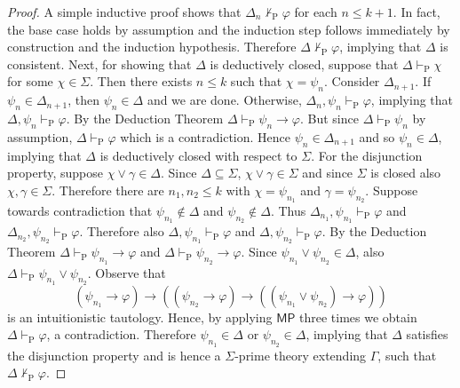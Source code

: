 \documentclass{myifcolog}
\numberwithin{theorem}{section}
\begin{document}
\begin{proof}
A simple inductive proof shows that $\Delta_n \not \vdash_\mathrm{P} \varphi$ for each $n \leq k+1$. In fact, the base case holds by assumption and the induction step follows immediately by construction and the induction hypothesis. Therefore $\Delta \not \vdash_\mathrm{P} \varphi$, implying that $\Delta$ is consistent. Next, for showing that $\Delta$ is deductively closed, suppose that $\Delta \vdash_\mathrm{P} \chi$ for some $\chi \in \Sigma$. Then there exists $n \leq k$ such that $\chi = \psi_n$. Consider $\Delta_{n+1}$. If $\psi_n \in \Delta_{n+1}$, then $\psi_n \in \Delta$ and we are done. Otherwise, $\Delta_n, \psi_n \vdash_\mathrm{P} \varphi$, implying that $\Delta, \psi_n \vdash_\mathrm{P} \varphi$. By the Deduction Theorem $\Delta \vdash_\mathrm{P} \psi_n \rightarrow \varphi$. But since $\Delta \vdash_\mathrm{P} \psi_n$ by assumption, $\Delta \vdash_\mathrm{P} \varphi$ which is a contradiction. Hence $\psi_n \in \Delta_{n+1}$ and so $\psi_n \in \Delta$, implying that $\Delta$ is deductively closed with respect to $\Sigma$. For the disjunction property, suppose $\chi \vee \gamma \in \Delta$. Since $\Delta \subseteq \Sigma$, $\chi \vee \gamma \in \Sigma$ and since $\Sigma$ is closed also $\chi, \gamma \in \Sigma$. Therefore there are $n_1, n_2 \leq k$ with $\chi = \psi_{n_1}$ and $\gamma = \psi_{n_2}$. Suppose towards contradiction that $\psi_{n_1} \not \in \Delta$ and $\psi_{n_2} \not \in \Delta$. Thus $\Delta_{n_1}, \psi_{n_1} \vdash_\mathrm{P} \varphi$ and $\Delta_{n_2}, \psi_{n_2} \vdash_\mathrm{P} \varphi$. Therefore also $\Delta, \psi_{n_1} \vdash_\mathrm{P} \varphi$ and $\Delta, \psi_{n_2} \vdash_\mathrm{P} \varphi$. By the Deduction Theorem $\Delta \vdash_\mathrm{P} \psi_{n_1} \rightarrow \varphi$ and $\Delta \vdash_\mathrm{P} \psi_{n_2} \rightarrow \varphi$. Since $\psi_{n_1} \vee \psi_{n_2} \in \Delta$, also $\Delta \vdash_\mathrm{P} \psi_{n_1} \vee \psi_{n_2}$. Observe that
\begin{equation*}
    (\psi_{n_1} \rightarrow \varphi) \rightarrow ((\psi_{n_2} \rightarrow \varphi) \rightarrow ((\psi_{n_1} \vee \psi_{n_2}) \rightarrow \varphi))
\end{equation*}
is an intuitionistic tautology. Hence, by applying $\mathsf{MP}$ three times we obtain $\Delta \vdash_\mathrm{P} \varphi$, a contradiction. Therefore $\psi_{n_1} \in \Delta$ or $\psi_{n_2} \in \Delta$, implying that $\Delta$ satisfies the disjunction property and is hence a $\Sigma$-prime theory extending $\Gamma$, such that $\Delta \not \vdash_\mathrm{P} \varphi$. \smallskip


\end{proof}
\end{document}
